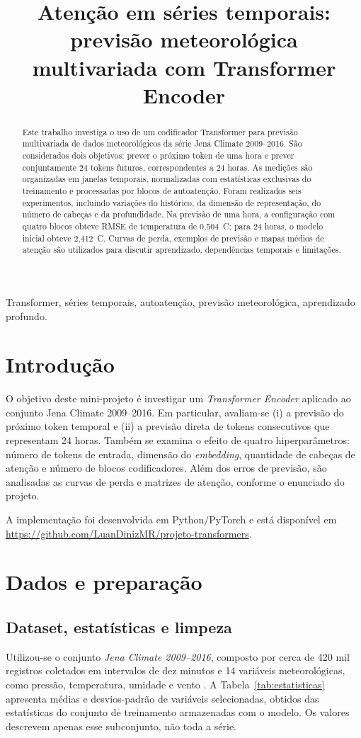 \documentclass[conference,a4paper]{IEEEtran}
\title{Atenção em séries temporais: previsão meteorológica multivariada com Transformer Encoder}
\author{\IEEEauthorblockN{Luan Diniz Mazaro Rodovalho}
\IEEEauthorblockA{Universidade Federal de Uberlândia (UFU)\\Brasil}}
\begin{document}
\maketitle
\begin{abstract}
Este trabalho investiga o uso de um codificador Transformer para previsão multivariada de dados meteorológicos da série Jena Climate 2009--2016. São considerados dois objetivos: prever o próximo token de uma hora e prever conjuntamente 24 tokens futuros, correspondentes a 24 horas. As medições são organizadas em janelas temporais, normalizadas com estatísticas exclusivas do treinamento e processadas por blocos de autoatenção. Foram realizados seis experimentos, incluindo variações do histórico, da dimensão de representação, do número de cabeças e da profundidade. Na previsão de uma hora, a configuração com quatro blocos obteve RMSE de temperatura de 0,504~\textdegree C; para 24 horas, o modelo inicial obteve 2,412~\textdegree C. Curvas de perda, exemplos de previsão e mapas médios de atenção são utilizados para discutir aprendizado, dependências temporais e limitações.
\end{abstract}
\begin{IEEEkeywords}
Transformer, séries temporais, autoatenção, previsão meteorológica, aprendizado profundo.
\end{IEEEkeywords}

\section{Introdução}
O objetivo deste mini-projeto é investigar um \emph{Transformer Encoder} aplicado ao conjunto Jena Climate 2009--2016. Em particular, avaliam-se (i) a previsão do próximo token temporal e (ii) a previsão direta de tokens consecutivos que representam 24 horas. Também se examina o efeito de quatro hiperparâmetros: número de tokens de entrada, dimensão do \emph{embedding}, quantidade de cabeças de atenção e número de blocos codificadores. Além dos erros de previsão, são analisadas as curvas de perda e matrizes de atenção, conforme o enunciado do projeto.

A implementação foi desenvolvida em Python/PyTorch e está disponível em \url{https://github.com/LuanDinizMR/projeto-transformers}.

\section{Dados e preparação}
\subsection{Dataset, estatísticas e limpeza}
Utilizou-se o conjunto \emph{Jena Climate 2009--2016}, composto por cerca de 420 mil registros coletados em intervalos de dez minutos e 14 variáveis meteorológicas, como pressão, temperatura, umidade e vento \cite{jena}. A Tabela~\ref{tab:estatisticas} apresenta médias e desvios-padrão de variáveis selecionadas, obtidos das estatísticas do conjunto de treinamento armazenadas com o modelo. Os valores descrevem apenas esse subconjunto, não toda a série.
\end{document}
